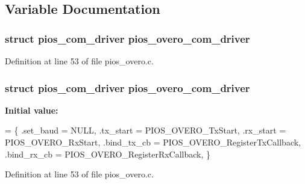 \subsection{Variable Documentation}
\hypertarget{group___p_i_o_s___o_v_e_r_o_ga07e1a9093b33ec66c4e896e83834bfd6}{
\subsubsection[{pios\-\_\-overo\-\_\-com\-\_\-driver}]{\setlength{\rightskip}{0pt plus 5cm}struct {\bf pios\-\_\-com\-\_\-driver} pios\-\_\-overo\-\_\-com\-\_\-driver}}\label{group___p_i_o_s___o_v_e_r_o_ga07e1a9093b33ec66c4e896e83834bfd6}


Definition at line 53 of file pios\-\_\-overo.\-c.

\hypertarget{group___p_i_o_s___o_v_e_r_o_ga07e1a9093b33ec66c4e896e83834bfd6}{
\subsubsection[{pios\-\_\-overo\-\_\-com\-\_\-driver}]{\setlength{\rightskip}{0pt plus 5cm}struct {\bf pios\-\_\-com\-\_\-driver} pios\-\_\-overo\-\_\-com\-\_\-driver}}\label{group___p_i_o_s___o_v_e_r_o_ga07e1a9093b33ec66c4e896e83834bfd6}
{\bfseries Initial value\-:}
\begin{DoxyCode}
= \{
        .set\_baud   = NULL,
        .tx\_start   = PIOS\_OVERO\_TxStart,
        .rx\_start   = PIOS\_OVERO\_RxStart,
        .bind\_tx\_cb = PIOS\_OVERO\_RegisterTxCallback,
        .bind\_rx\_cb = PIOS\_OVERO\_RegisterRxCallback,
\}
\end{DoxyCode}


Definition at line 53 of file pios\-\_\-overo.\-c.

